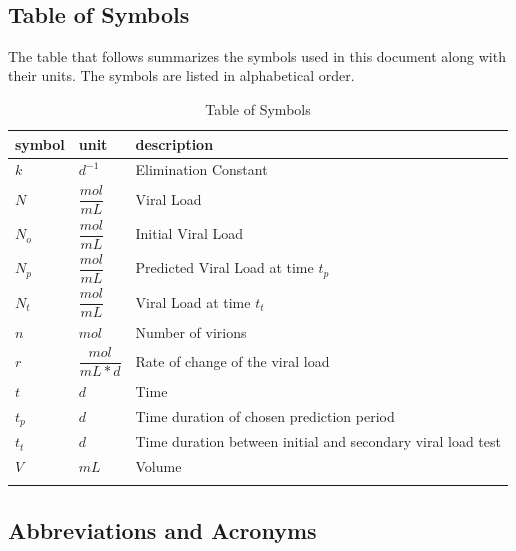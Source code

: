 \documentclass[12pt]{article}
\begin{document}
 
~\newpage
\subsection{Table of Symbols}

The table that follows summarizes the symbols used in this document along with
their units. The symbols are listed in alphabetical order.

\begin{table}[H]
\renewcommand{\arraystretch}{1.2}
\noindent \begin{longtable*}{l l p{12cm}} \toprule
\textbf{symbol} & \textbf{unit} & \textbf{description}\\
\midrule 
$k$ & $d^{-1}$ & Elimination Constant
\\
$N$ & $\dfrac{mol}{mL}$ & Viral Load
\\ 
$N_{o}$ & $\dfrac{mol}{mL}$  & Initial Viral Load
\\ 
$N_{p}$ & $\dfrac{mol}{mL}$  & Predicted Viral Load at time 
$t_{p}$
\\ 
$N_{t}$ & $\dfrac{mol}{mL}$  & Viral Load at time $t_{t}$
\\ 
$n$ & $mol$ & Number of virions
\\ 
$r$ & $\dfrac{mol}{mL*d}$  & Rate of change of the viral 
load
\\
$t$ & $d$ & Time
\\

$t_{p}$ & $d$ & Time duration of chosen prediction 
period 
\\
$t_{t}$ & $d$ & Time duration between initial and  
secondary viral load test
\\
$V$ & $mL$ & Volume
\\
&\\
\bottomrule

\end{longtable*}
\caption{Table of Symbols}
\end{table}

\newpage

\subsection{Abbreviations and Acronyms}
\end{document}
